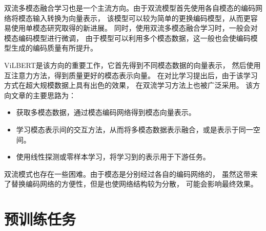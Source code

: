 双流多模态融合学习也是一个主流方向。由于双流模型首先使用各自模态的编码网络将模态输入转换为向量表示，
该模型可以较为简单的更换编码模型，从而更容易使用单模态研究取得的新进展。
同时，使用双流多模态融合学习时，一般会对模态编码模型进行微调，
由于模型可以利用多个模态数据，这一般也会使编码模型生成的编码质量有所提升。

ViLBERT\cite{vilbert}是该方向的重要工作，它首先得到不同模态数据的向量表示，
然后使用互注意力方法，得到质量更好的模态表示向量。
在对比学习提出后，由于该学习方式在超大规模数据上具有出色的效果，
在双流学习方法上也被广泛采用。
该方向文章的主要思路为：

\begin{itemize}
    \item 获取多模态数据，通过模态编码网络得到模态向量表示。
    \item 学习模态表示间的交互方法，从而将多模态数据表示融合，或是表示于同一空间。
    \item 使用线性探测或零样本学习，将学习到的表示用于下游任务。
\end{itemize}

双流模式也存在一些困难。由于模态是分别经过各自的编码网络的，
虽然这带来了替换编码网络的方便性，但是也使网络结构较为分散，
可能会影响最终效果。

\section{预训练任务}\label{sec:pretrain}

